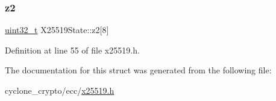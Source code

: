\mbox{\label{structX25519State_afe45ed80227eb8e45144eef85169c5d5}} 
\subsubsection{\texorpdfstring{z2}{z2}}
{\footnotesize\ttfamily \hyperlink{stdint_8h_a435d1572bf3f880d55459d9805097f62}{uint32\+\_\+t} X25519\+State\+::z2\mbox{[}8\mbox{]}}



Definition at line 55 of file x25519.\+h.



The documentation for this struct was generated from the following file\+:\begin{DoxyCompactItemize}
\item 
cyclone\+\_\+crypto/ecc/\hyperlink{x25519_8h}{x25519.\+h}\end{DoxyCompactItemize}
